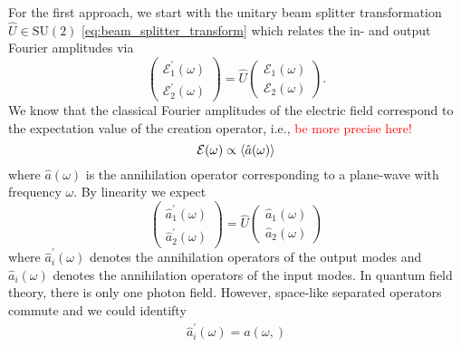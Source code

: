 For the first approach, we start with the unitary beam splitter transformation $\hat{U}\in\text{SU}(2)$ \cref{eq:beam_splitter_transform} which relates the in- and output Fourier amplitudes via
\begin{equation}
	\begin{pmatrix}
		\mathcal{E}_1^\prime(\omega)
		\\
		\mathcal{E}_2^\prime(\omega)
	\end{pmatrix}
	=
	\hat{U}
	\begin{pmatrix}
		\mathcal{E}_1(\omega)
		\\
		\mathcal{E}_2(\omega)
	\end{pmatrix}
	.
\end{equation}
We know that the classical Fourier amplitudes of the electric field correspond to the expectation value of the creation operator, i.e., \textcolor{red}{be more precise here!}
\begin{equation}
	\mathcal{E}(\omega)
	\propto
	\expval{\hat{a}(\omega)}
\end{equation}
where $\hat{a}(\omega)$ is the annihilation operator corresponding to a plane-wave with frequency $\omega$.
By linearity we expect
\begin{equation}
	\begin{pmatrix}
		\hat{a}_1^\prime(\omega)
		\\
		\hat{a}_2^\prime(\omega)
	\end{pmatrix}
	=
	\hat{U}
	\begin{pmatrix}
		\hat{a}_1(\omega)
		\\
		\hat{a}_2(\omega)
	\end{pmatrix}
\end{equation}
where $\hat{a}_i^\prime(\omega)$ denotes the annihilation operators of the output modes and $\hat{a}_i(\omega)$ denotes the annihilation operators of the input modes.
In quantum field theory, there is only one photon field.
However, space-like separated operators commute and we could identifty
\begin{align}
	\hat{a}^\prime_i(\omega)
	=
	\hat{a}(\omega,)
\end{align}

